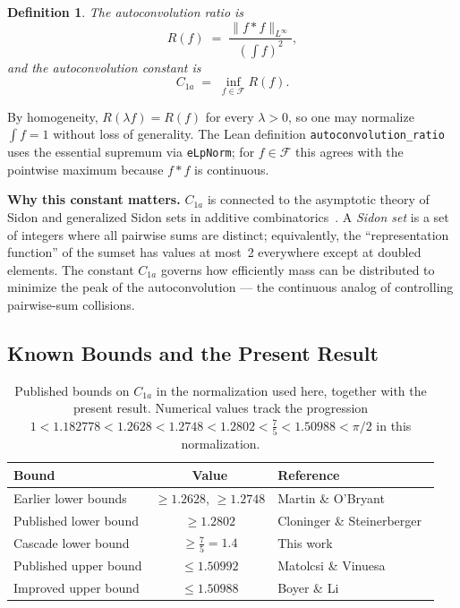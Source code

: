 \documentclass[11pt, letterpaper]{article}
\theoremstyle{paperplain}
\theoremstyle{paperdef}
\newtheorem{definition}[theorem]{Definition}
\begin{document}
\begin{definition}
The \emph{autoconvolution ratio} is
\[
  R(f)
  \;=\;
  \frac{\|f*f\|_{L^\infty}}{\left(\int f\right)^2},
\]
and the \emph{autoconvolution constant} is
\[
  C_{1a} \;=\; \inf_{f \in \mathcal{F}} R(f).
\]
\end{definition}

By homogeneity, $R(\lambda f)=R(f)$ for every $\lambda>0$, so one may
normalize $\int f=1$ without loss of generality.  The Lean definition
\texttt{autoconvolution\_ratio} uses the essential supremum via
\texttt{eLpNorm}; for $f\in\mathcal{F}$ this agrees with the pointwise
maximum because $f*f$ is continuous.

\medskip

\noindent\textbf{Why this constant matters.}  $C_{1a}$ is connected to
the asymptotic theory of Sidon and generalized Sidon sets in additive
combinatorics~\cite{ET41,MO2006,CRV10,MO2009,CillerueloVinuesa2008,CS17}.  A
\emph{Sidon set} is a set of integers where all pairwise sums are
distinct; equivalently, the ``representation function'' of the sumset
has values at most~2 everywhere except at doubled elements.  The
constant $C_{1a}$ governs how efficiently mass can be distributed to
minimize the peak of the autoconvolution --- the continuous analog of
controlling pairwise-sum collisions.

\subsection{Known Bounds and the Present Result}

\begin{table}[t]
\centering
\begin{tabular}{lcl}
  \toprule
  \textbf{Bound} & \textbf{Value} & \textbf{Reference} \\
  \midrule
  Earlier lower bounds  & $\ge 1.2628$, $\ge 1.2748$ & Martin \& O'Bryant~\cite{MO2007,MO2009} \\
  Published lower bound & $\ge 1.2802$ & Cloninger \& Steinerberger~\cite{CS17} \\
  Cascade lower bound   & $\ge \tfrac{7}{5} = 1.4$ & This work \\
  Published upper bound & $\le 1.50992$ & Matolcsi \& Vinuesa~\cite{MV10} \\
  Improved upper bound  & $\le 1.50988$ & Boyer \& Li~\cite{BL26} \\
  \bottomrule
\end{tabular}
\caption[Published bounds on $C_{1a}$ in the normalization used here.]{Published bounds on $C_{1a}$ in the normalization used here,
  together with the present result.  Numerical values track the
  progression $1<1.182778<1.2628<1.2748<1.2802<\tfrac{7}{5}<1.50988<\pi/2$
  in this normalization.}
\label{tab:published-bounds}
\end{table}
\end{document}
